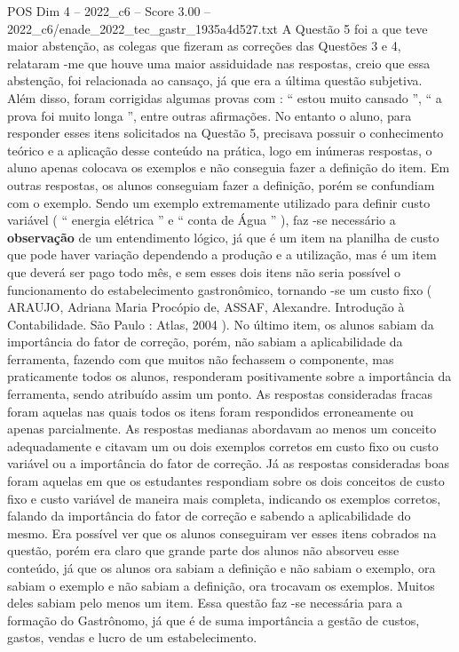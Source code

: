 \begin{textsample}{POS Dim 4 – 2022\_c6 – Score 3.00 – 2022\_c6/enade\_2022\_tec\_gastr\_1935a4d527.txt}
A Questão 5 foi a que teve maior abstenção, as colegas que fizeram as correções das Questões 3 e 4, relataram -me que houve uma maior assiduidade nas respostas, creio que essa abstenção, foi relacionada ao cansaço, já que era a última questão subjetiva.
Além disso, foram corrigidas algumas provas com : “ estou muito cansado ”, “ a prova foi muito longa ”, entre outras afirmações.
No entanto o aluno, para responder esses itens solicitados na Questão 5, precisava possuir o conhecimento teórico e a aplicação desse conteúdo na prática, logo em inúmeras respostas, o aluno apenas colocava os exemplos e não conseguia fazer a definição do item.
Em outras respostas, os alunos conseguiam fazer a definição, porém se confundiam com o exemplo.
Sendo um exemplo extremamente utilizado para definir custo variável ( “ energia elétrica ” e “ conta de Água ” ), faz -se necessário a \textbf{observação} de um entendimento lógico, já que é um item na planilha de custo que pode haver variação dependendo a produção e a utilização, mas é um item que deverá ser pago todo mês, e sem esses dois itens não seria possível o funcionamento do estabelecimento gastronômico, tornando -se um custo fixo ( ARAUJO, Adriana Maria Procópio de, ASSAF, Alexandre.
Introdução à Contabilidade.
São Paulo : Atlas, 2004 ).
No último item, os alunos sabiam da importância do fator de correção, porém, não sabiam a aplicabilidade da ferramenta, fazendo com que muitos não fechassem o componente, mas praticamente todos os alunos, responderam positivamente sobre a importância da ferramenta, sendo atribuído assim um ponto.
As respostas consideradas fracas foram aquelas nas quais todos os itens foram respondidos erroneamente ou apenas parcialmente.
As respostas medianas abordavam ao menos um conceito adequadamente e citavam um ou dois exemplos corretos em custo fixo ou custo variável ou a importância do fator de correção.
Já as respostas consideradas boas foram aquelas em que os estudantes respondiam sobre os dois conceitos de custo fixo e custo variável de maneira mais completa, indicando os exemplos corretos, falando da importância do fator de correção e sabendo a aplicabilidade do mesmo.
Era possível ver que os alunos conseguiram ver esses itens cobrados na questão, porém era claro que grande parte dos alunos não absorveu esse conteúdo, já que os alunos ora sabiam a definição e não sabiam o exemplo, ora sabiam o exemplo e não sabiam a definição, ora trocavam os exemplos.
Muitos deles sabiam pelo menos um item.
Essa questão faz -se necessária para a formação do Gastrônomo, já que é de suma importância a gestão de custos, gastos, vendas e lucro de um estabelecimento.

\end{textsample}
